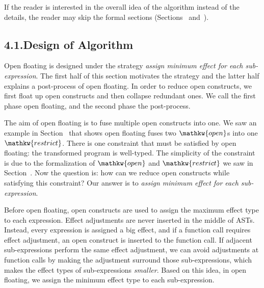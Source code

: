 \documentclass{llncs}
\begin{document}
If the reader is interested in the overall idea of the algorithm instead of the details,
the reader may skip the formal sections (Sections~ and~).%

\subsection{4.1.\hspace*{0.5em}Design of Algorithm}%

\noindent Open floating is designed under the strategy \emph{assign minimum effect for each sub-expression}.
The first half of this section motivates the strategy and the latter half explains a post-process of open floating.
In order to reduce open constructs, we first float up open constructs and then collapse redundant ones.
We call the first phase open floating, and the second phase the post-process.%

The aim of open floating is to fuse multiple open constructs into one.
We saw an example in Section~ that shows open floating fuses two $\mathpre{\mathkw{open}}$s into one $\mathpre{\mathkw{restrict}}$.
There is one constraint that must be satisfied by open floating: the transformed program is well-typed.
The simplicity of the constraint is due to the formalization of $\mathpre{\mathkw{open}}$ and $\mathpre{\mathkw{restrict}}$ we saw in Section~.
Now the question is: how can we reduce open constructs while satisfying this constraint?
Our answer is to \emph{assign minimum effect for each sub-expression}.%

Before open floating, open constructs are used to assign the maximum effect type to each expression.
Effect adjustments are never inserted in the middle of ASTs.
Instead, every expression is assigned a big effect, and if a function call requires effect adjustment, an open construct is inserted to the function call.
If adjacent sub-expressions perform the same effect adjustment,
we can avoid adjustments at function calls by making the adjustment surround those sub-expressions,
which makes the effect types of sub-expressions \emph{smaller}.
Based on this idea, in open floating, we assign the minimum effect type to each sub-expression.%
\end{document}
